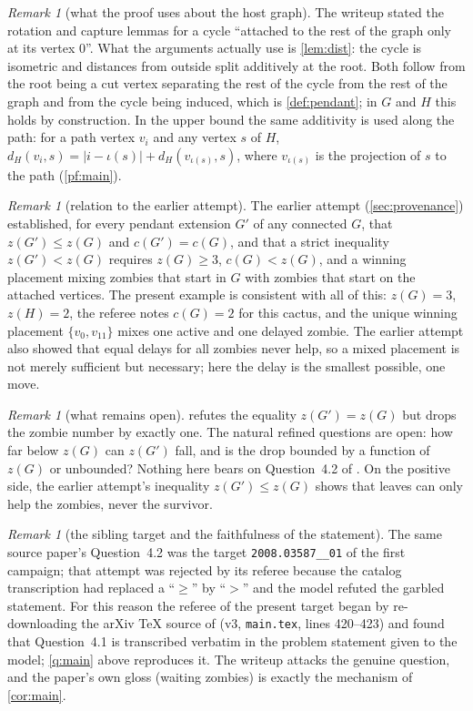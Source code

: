 \documentclass[11pt,a4paper]{article}
\theoremstyle{plain}
\theoremstyle{definition}
\theoremstyle{remark}
\newtheorem{remark}[theorem]{Remark}
\newcommand{\dist}{d}
\newcommand{\idx}{\iota}
\begin{document}
\begin{remark}[what the proof uses about the host graph]\label{rem:isometry}
The writeup stated the rotation and capture lemmas for a cycle ``attached to the rest of the graph only at its vertex $0$''. What the arguments actually use is \cref{lem:dist}: the cycle is isometric and distances from outside split additively at the root. Both follow from the root being a cut vertex separating the rest of the cycle from the rest of the graph and from the cycle being induced, which is \cref{def:pendant}; in $G$ and $H$ this holds by construction. In the upper bound the same additivity is used along the path: for a path vertex $v_i$ and any vertex $s$ of $H$, $\dist_H(v_i,s)=|i-\idx(s)|+\dist_H(v_{\idx(s)},s)$, where $v_{\idx(s)}$ is the projection of $s$ to the path (\cref{pf:main}).
\end{remark}

\begin{remark}[relation to the earlier attempt]\label{rem:earlier}
The earlier attempt (\cref{sec:provenance}) established, for every pendant extension $G'$ of any connected $G$, that $z(G')\le z(G)$ and $c(G')=c(G)$, and that a strict inequality $z(G')<z(G)$ requires $z(G)\ge3$, $c(G)<z(G)$, and a winning placement mixing zombies that start in $G$ with zombies that start on the attached vertices. The present example is consistent with all of this: $z(G)=3$, $z(H)=2$, the referee notes $c(G)=2$ for this cactus, and the unique winning placement $\{v_0,v_{11}\}$ mixes one active and one delayed zombie. The earlier attempt also showed that equal delays for all zombies never help, so a mixed placement is not merely sufficient but necessary; here the delay is the smallest possible, one move.
\end{remark}

\begin{remark}[what remains open]\label{rem:open}
 refutes the equality $z(G')=z(G)$ but drops the zombie number by exactly one. The natural refined questions are open: how far below $z(G)$ can $z(G')$ fall, and is the drop bounded by a function of $z(G)$ or unbounded? Nothing here bears on Question~4.2 of \cite{BBBLN21}. On the positive side, the earlier attempt's inequality $z(G')\le z(G)$ shows that leaves can only help the zombies, never the survivor.
\end{remark}

\begin{remark}[the sibling target and the faithfulness of the statement]\label{rem:sibling}
The same source paper's Question~4.2 was the target \texttt{2008.03587\_\_01} of the first campaign; that attempt was rejected by its referee because the catalog transcription had replaced a ``$\ge$'' by ``$>$'' and the model refuted the garbled statement. For this reason the referee of the present target began by re-downloading the arXiv TeX source of \cite{BBBLN21} (v3, \texttt{main.tex}, lines 420--423) and found that Question~4.1 is transcribed verbatim in the problem statement given to the model; \cref{q:main} above reproduces it. The writeup attacks the genuine question, and the paper's own gloss (waiting zombies) is exactly the mechanism of \cref{cor:main}.
\end{remark}
\end{document}
